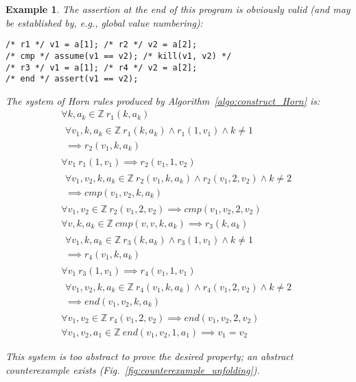\documentclass[a4paper]{article}
\newcommand{\ZZ}{\mathbb{Z}}
\theoremstyle{definition}
\theoremstyle{plain}
\newtheorem{example}{Example}
\newcommand{\rulespacing}{\\[0.4em]}
\begin{document}
\begin{example}\label{ex:counterexample}
The assertion at the end of this program is obviously valid (and may be established by, e.g., global value numbering):
\begin{lstlisting}
/* r1 */ v1 = a[1]; /* r2 */ v2 = a[2];
/* cmp */ assume(v1 == v2); /* kill(v1, v2) */
/* r3 */ v1 = a[1]; /* r4 */ v2 = a[2];
/* end */ assert(v1 == v2);
\end{lstlisting}

The system of Horn rules produced by Algorithm~\ref{algo:construct_Horn} is:
{\small\begin{align}
\forall k,a_k \in \ZZ~ r_1(k, a_k) \rulespacing
\begin{aligned}
\forall v_1,k,a_k \in \ZZ~
  r_1(k,a_k) \land r_1(1,v_1) \land k\neq 1\\
  \implies r_2(v_1, k, a_k)
\end{aligned}\rulespacing
\forall v_1~ r_1(1,v_1) \implies r_2(v_1,1,v_2) \label{rule:counterexample_r1b}\\
\begin{aligned}
\forall v_1,v_2,k,a_k \in \ZZ~
  r_2(v_1,k,a_k) \land r_2(v_1,2,v_2) \land k\neq 2\\ 
  \implies \mathit{cmp}(v_1,v_2,k,a_k)
\end{aligned} \label{rule:counterexample_r2a}\rulespacing
\forall v_1,v_2 \in \ZZ~ r_2(v_1,2,v_2) \implies \mathit{cmp}(v_1,v_2,2,v_2) \rulespacing
\forall v,k,a_k \in \ZZ~
  \mathit{cmp}(v,v,k,a_k) \implies r_3(k,a_k)  \label{rule:counterexample_cmp} \rulespacing
\begin{aligned}
\forall v_1,k,a_k \in \ZZ~
  r_3(k,a_k) \land r_3(1,v_1) \land k\neq 1\\
 \implies  r_4(v_1, k, a_k)
\end{aligned} \rulespacing
\forall v_1~ r_3(1,v_1) \implies r_4(v_1,1,v_1)  \label{rule:counterexample_r3b} \rulespacing
\begin{aligned}
\forall v_1,v_2,k,a_k \in \ZZ~
  r_4(v_1,k,a_k) \land r_4(v_1,2,v_2) \land k\neq 2\\
  \implies \mathit{end}(v_1,v_2,k,a_k)
\end{aligned}  \label{rule:counterexample_r4a} \rulespacing
\forall v_1,v_2 \in \ZZ~ r_4(v_1,2,v_2) \implies \mathit{end}(v_1,v_2,2,v_2) \rulespacing
\forall v_1,v_2,a_1 \in \ZZ~ \mathit{end}(v_1,v_2,1,a_1) \implies v_1=v_2
\end{align}}

This system is too abstract to prove the desired property; an abstract counterexample exists (Fig.~\ref{fig:counterexample_unfolding}).
\end{example}
\end{document}
